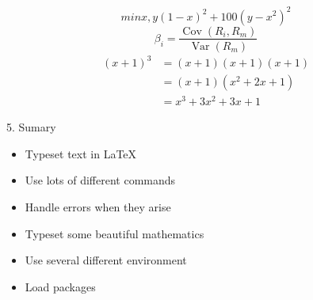\documentclass{article}
\begin{document}
\begin{equation*}
    min{x,y}{(1-x)^2 + 100(y-x^2)^2}
\end{equation*}
\begin{equation*}
    \beta_i = 
    \frac{\operatorname{Cov}(R_i,R_m)}{\operatorname{Var}(R_m)}
\end{equation*} 
\begin{align*}
    (x+1)^3 &= (x+1)(x+1)(x+1) \\
            &= (x+1)(x^2+2x+1) \\
            &= x^3+3x^2+3x+1
\end{align*}

5. Sumary
\begin{itemize}
    \item Typeset text in \LaTeX
    \item Use lots of different commands
    \item Handle errors when they arise
    \item Typeset some beautiful mathematics
    \item Use several different environment
    \item Load packages
\end{itemize}
\end{document}
